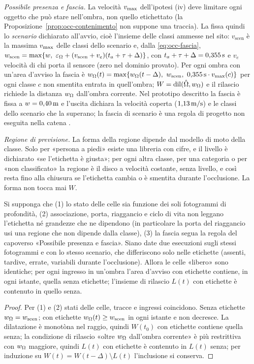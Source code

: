 \emph{Possibile presenza e fascia.} La velocità $v_{\max}$ dell'ipotesi (iv) deve limitare ogni oggetto che può stare nell'ombra, non quello etichettato (la Proposizione~\ref{prop:occ-contenimento} non suppone una traccia). La fissa quindi lo \emph{scenario} dichiarato all'avvio, cioè l'insieme delle classi ammesse nel sito: $v_{\mathrm{scen}}$ è la massima $v_{\max}$ delle classi dello scenario e, dalla \eqref{eq:occ-fascia}, $w_{\mathrm{scen}}=\max\{w,\ \varepsilon_\Omb+(v_{\mathrm{scen}}+v_e)(t_a+\tau+\Delta)\}$, con $t_a+\tau+\Delta=0{,}355\,\mathrm{s}$ e $v_e$ velocità di chi porta il sensore (zero nel dominio provato). Per ogni ombra con un'area d'avviso la fascia è $w_\Omb(t)=\max\{w_\Omb(t-\Delta),\ w_{\mathrm{scen}},\ 0{,}355\unita{s}\cdot\vmax(c)\}$ per ogni classe $c$ non smentita entrata in quell'ombra; $W=\operatorname{dil}(\hat{\Omega},w_\Omega)$ e il rilascio richiede la distanza $w_\Omega$ dall'ombra corrente. Nel prototipo descritto la fascia è fissa a $w=0{,}40\,\mathrm{m}$ e l'uscita dichiara la velocità coperta ($1{,}13\,\mathrm{m/s}$) e le classi dello scenario che la superano; la fascia di scenario è una regola di progetto non eseguita nella catena .

\emph{Regione di previsione.} La forma della regione dipende dal modello di moto della classe. Solo per «persona a piedi» esiste una libreria con cifre, e il livello è dichiarato «se l'etichetta è giusta»; per ogni altra classe, per una categoria o per «non classificato» la regione è il disco a velocità costante, senza livello, e così resta fino alla chiusura se l'etichetta cambia o è smentita durante l'occlusione. La forma non tocca mai $W$.

\begin{proposizione}\label{prop:occ-etichetta}
Si supponga che (1) lo stato delle celle sia funzione dei soli fotogrammi di profondità, (2) associazione, porta, riaggancio e ciclo di vita non leggano l'etichetta né grandezze che ne dipendono (in particolare la porta del riaggancio usi una regione che non dipende dalla classe), (3) la fascia segua la regola del capoverso «Possibile presenza e fascia». Siano date due esecuzioni sugli stessi fotogrammi e con lo stesso scenario, che differiscono solo nelle etichette (assenti, tardive, errate, variabili durante l'occlusione). Allora le celle «libero» sono identiche; per ogni ingresso in un'ombra l'area d'avviso con etichette contiene, in ogni istante, quella senza etichette; l'insieme di rilascio $L(t)$ con etichette è contenuto in quello senza. 
\end{proposizione}
\begin{proof}
Per (1) e (2) stati delle celle, tracce e ingressi coincidono. Senza etichette $w_\Omega=w_{\mathrm{scen}}$; con etichette $w_\Omega(t)\ge w_{\mathrm{scen}}$ in ogni istante e non decresce. La dilatazione è monotòna nel raggio, quindi $W(t_0)$ con etichette contiene quella senza; la condizione di rilascio «oltre $w_\Omega$ dall'ombra corrente» è più restrittiva con $w_\Omega$ maggiore, quindi $L(t)$ con etichette è contenuto in $L(t)$ senza; per induzione su $W(t)=W(t-\Delta)\setminus L(t)$ l'inclusione si conserva.
\end{proof}

